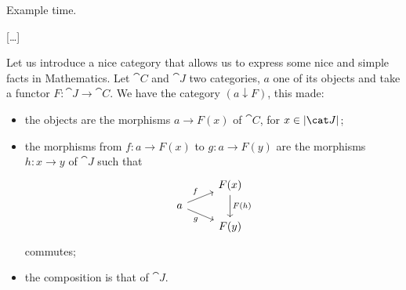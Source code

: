 Example time.

[\dots{}]

\begin{construction}
Let us introduce a nice category that allows us to express some nice and simple facts in Mathematics. Let \(\cat C\) and \(\cat J\) two categories, \(a\) one of its objects and take a functor \(F : \cat J \to \cat C\). We have the category \((a \downarrow F)\), this made:
\begin{itemize}
\item the objects are the morphisms \(a \to F(x)\) of \(\cat C\), for \(x \in \obj{\cat J}\);
\item the morphisms from \(f : a \to F(x)\) to \(g : a \to F(y)\) are the morphisms \(h : x \to y\) of \(\cat J\) such that
\[\begin{tikzcd}[row sep=tiny]
 & F(x) \ar["{F(h)}", dd] \\
a \ar["f", ur] \ar["g", dr, swap] \\
 & F(y)
\end{tikzcd}\]
commutes;
\item the composition is that of \(\cat J\). 
\end{itemize}
\end{construction}

